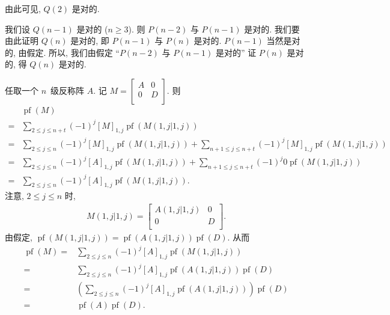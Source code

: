 \documentclass[../libro.tex]{subfiles}
\begin{document}
\begin{example}
    由此可见, \(Q(2)\) 是对的.

    我们设 \(Q(n-1)\) 是对的 (\(n \geq 3\)).
    则 \(P(n-2)\) 与 \(P(n-1)\) 是对的.
    我们要由此证明 \(Q(n)\) 是对的,
    即 \(P(n-1)\) 与 \(P(n)\) 是对的.
    \(P(n-1)\) 当然是对的, 由假定.
    所以, 我们由假定
    ``\(P(n-2)\) 与 \(P(n-1)\) 是对的''
    证 \(P(n)\) 是对的,
    得 \(Q(n)\) 是对的.

    任取一个 \(n\)~级反称阵 \(A\).
    记 \(M =
        \begin{bmatrix}
            A & 0 \\
            0 & D \\
        \end{bmatrix}
    \).
    则
    \begin{align*}
        &
        \operatorname{pf} {(M)}
        \\
        = {} &
        \sum_{2 \leq j \leq n+t}
        {(-1)^{j} [M]_{1,j} \operatorname{pf} {(M({1,j}|{1,j}))}}
        \\
        = {} &
        \sum_{2 \leq j \leq n}
        {(-1)^{j} [M]_{1,j} \operatorname{pf} {(M({1,j}|{1,j}))}}
        +
        \sum_{n+1 \leq j \leq n+t}
        {(-1)^{j} [M]_{1,j} \operatorname{pf} {(M({1,j}|{1,j}))}}
        \\
        = {} &
        \sum_{2 \leq j \leq n}
        {(-1)^{j} [A]_{1,j} \operatorname{pf} {(M({1,j}|{1,j}))}}
        +
        \sum_{n+1 \leq j \leq n+t}
        {(-1)^{j} 0 \operatorname{pf} {(M({1,j}|{1,j}))}}
        \\
        = {} &
        \sum_{2 \leq j \leq n}
        {(-1)^{j} [A]_{1,j} \operatorname{pf} {(M({1,j}|{1,j}))}}.
    \end{align*}
    注意, \(2 \leq j \leq n\) 时,
    \begin{align*}
        M({1,j}|{1,j}) =
        \begin{bmatrix}
            A({1,j}|{1,j}) & 0 \\
            0              & D \\
        \end{bmatrix}.
    \end{align*}
    由假定, \(\operatorname{pf} {(M({1,j}|{1,j}))}
        = \operatorname{pf} {(A({1,j}|{1,j}))}
    \operatorname{pf} {(D)}\).
    从而
    \begin{align*}
        \operatorname{pf} {(M)}
        = {} &
        \sum_{2 \leq j \leq n}
        {(-1)^{j} [A]_{1,j} \operatorname{pf} {(M({1,j}|{1,j}))}}
        \\
        = {} &
        \sum_{2 \leq j \leq n}
        {(-1)^{j} [A]_{1,j}
            \operatorname{pf} {(A({1,j}|{1,j}))} \operatorname{pf} {(D)}
        }
        \\
        = {} &
        \left(
            \sum_{2 \leq j \leq n}
            {(-1)^{j} [A]_{1,j}
            \operatorname{pf} {(A({1,j}|{1,j}))}}
        \right) \operatorname{pf} {(D)}
        \\
        = {} &
        \operatorname{pf} {(A)} \operatorname{pf} {(D)}.
    \end{align*}


\end{example}
\end{document}
